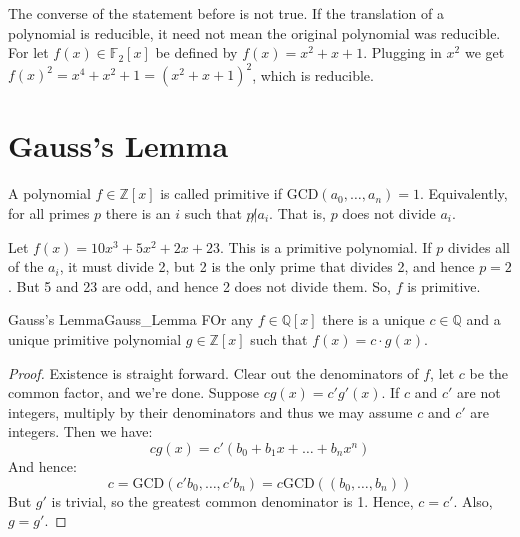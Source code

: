 \documentclass{article}                                                        %
\begin{document}
            The converse of the statement before is not true. If the translation
            of a polynomial is reducible, it need not mean the original
            polynomial was reducible. For let $f(x)\in\mathbb{F}_{2}[x]$ be
            defined by $f(x)=x^{2}+x+1$. Plugging in $x^{2}$ we get
            $f(x)^{2}=x^{4}+x^{2}+1=(x^{2}+x+1)^{2}$, which is reducible.
    \section{Gauss's Lemma}
        \begin{definition}
            A polynomial $f\in\mathbb{Z}[x]$ is called primitive if
            $\textrm{GCD}(a_{0},\dots,a_{n})=1$. Equivalently, for all primes
            $p$ there is an $i$ such that $p\not|a_{i}$. That is, $p$ does not
            divide $a_{i}$.
        \end{definition}
        \begin{example}
            Let $f(x)=10x^{3}+5x^{2}+2x+23$. This is a primitive polynomial.
            If $p$ divides all of the $a_{i}$, it must divide 2, but 2 is the
            only prime that divides 2, and hence $p=2$. But 5 and 23 are odd,
            and hence 2 does not divide them. So, $f$ is primitive.
        \end{example}
        \begin{ltheorem}{Gauss's Lemma}{Gauss_Lemma}
            FOr any $f\in\mathbb{Q}[x]$ there is a unique $c\in\mathbb{Q}$ and
            a unique primitive polynomial $g\in\mathbb{Z}[x]$ such that
            $f(x)=c\cdot{g}(x)$.
        \end{ltheorem}
        \begin{proof}
            Existence is straight forward. Clear out the denominators of $f$,
            let $c$ be the common factor, and we're done. Suppose
            $cg(x)=c'g'(x)$. If $c$ and $c'$ are not integers, multiply by their
            denominators and thus we may assume $c$ and $c'$ are integers. Then
            we have:
            \begin{equation}
                cg(x)=c'(b_{0}+b_{1}x+\dots+b_{n}x^{n})
            \end{equation}
            And hence:
            \begin{equation}
                c=\textrm{GCD}(c'b_{0},\dots,c'b_{n})
                 =c\textrm{GCD}((b_{0},\dots,b_{n}))
            \end{equation}
            But $g'$ is trivial, so the greatest common denominator is 1. Hence,
            $c=c'$. Also, $g=g'$.
        \end{proof}
\end{document}
